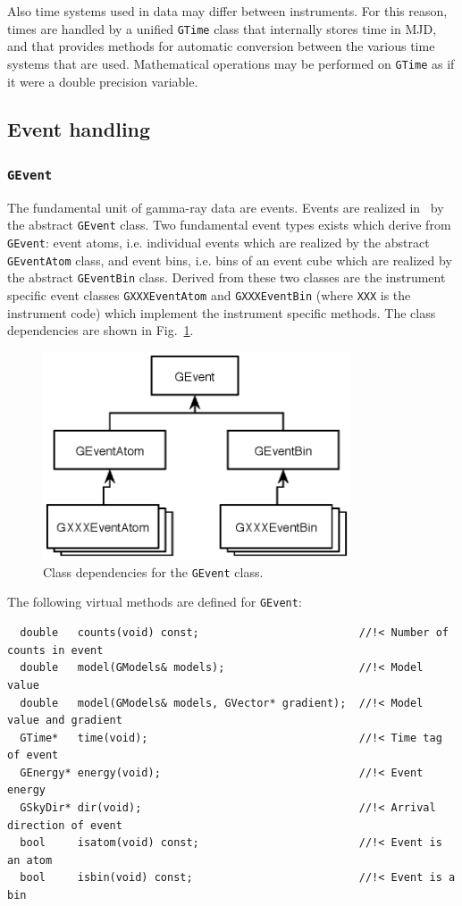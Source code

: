 \documentclass{article}[12pt,a4]
\begin{document}
Also time systems used in data may differ between instruments.
For this reason, times are handled by a unified {\tt GTime} class that internally stores
time in MJD, and that provides methods for automatic conversion between the various
time systems that are used.
Mathematical operations may be performed on {\tt GTime} as if it were a double
precision variable.


\subsection{Event handling}

\subsubsection{{\tt GEvent}}

The fundamental unit of gamma-ray data are events.
Events are realized in \this\ by the abstract {\tt GEvent} class.
Two fundamental event types exists which derive from {\tt GEvent}:
event atoms, i.e. individual events which are realized by the abstract {\tt GEventAtom} class, and
event bins, i.e. bins of an event cube which are realized by the abstract {\tt GEventBin} class.
Derived from these two classes are the instrument specific event classes
{\tt GXXXEventAtom} and {\tt GXXXEventBin} (where {\tt XXX} is the instrument code)
which implement the instrument specific methods.
The class dependencies are shown in Fig.~\ref{fig:GEvent}.
%
%
\begin{figure}[!h]
\centering
\includegraphics[width=9.1cm]{GEvent.eps}
\caption{Class dependencies for the {\tt GEvent} class.}
\label{fig:GEvent}
\end{figure}
%

The following virtual methods are defined for {\tt GEvent}:
\begin{verbatim}
  double   counts(void) const;                         //!< Number of counts in event
  double   model(GModels& models);                     //!< Model value
  double   model(GModels& models, GVector* gradient);  //!< Model value and gradient
  GTime*   time(void);                                 //!< Time tag of event
  GEnergy* energy(void);                               //!< Event energy
  GSkyDir* dir(void);                                  //!< Arrival direction of event
  bool     isatom(void) const;                         //!< Event is an atom
  bool     isbin(void) const;                          //!< Event is a bin
\end{verbatim}
\end{document}
